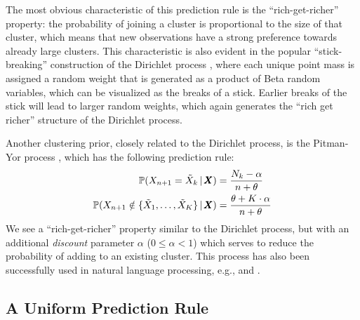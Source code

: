 \documentclass[]{article}
\begin{document}
The most obvious characteristic of this prediction rule is the
``rich-get-richer'' property: the probability of joining a cluster is
proportional to the size of that cluster, which means that new
observations have a strong preference towards already large clusters.
This characteristic is also evident in the popular ``stick-breaking''
construction of the Dirichlet process \cite{Set94,IshJam01}, where
each unique point mass is assigned a random weight that is generated
as a product of Beta random variables, which can be visualized as the
breaks of a stick.  Earlier breaks of the stick will lead to larger
random weights, which again generates the ``rich get richer''
structure of the Dirichlet process.  


Another clustering prior, closely related to the Dirichlet process, is
the Pitman-Yor process \cite{PitYor97}, which has the following
prediction rule:
\begin{align}
\mathbb{P}(X_{n + 1} = \tilde{X}_k \,|\, \pmb{X}) &= \frac{N_k-\alpha}{n
  + \theta} \notag \\
  \mathbb{P}(X_{n + 1} \notin \{\tilde{X}_1, \ldots, \tilde{X}_K\}\,|\, \pmb{X}) &=
\frac{\theta + K\cdot \alpha}{n + \theta} \label{PYrule}
\end{align}
We see a ``rich-get-richer'' property similar to the Dirichlet
process, but with an additional {\it discount} parameter $\alpha$ ($0 \leq \alpha <
1$) which serves to reduce the probability of adding to an existing
cluster.  This process has also been successfully used in natural
language processing, e.g., \cite{Teh06} and \cite{Wallach08}.

\subsection{A Uniform Prediction Rule}
\end{document}
